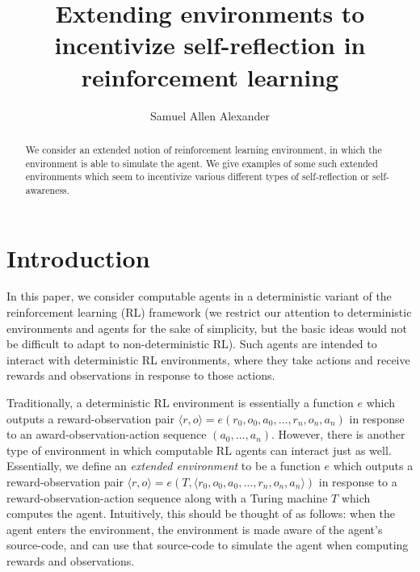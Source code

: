 \documentclass[runningheads]{llncs}
\begin{document}
\title{Extending environments to incentivize self-reflection
in reinforcement learning}

\author{Samuel Allen Alexander}

\maketitle

\begin{abstract}
    We consider an extended notion
    of reinforcement learning environment, in which the environment is able
    to simulate the agent. We give
    examples of some such extended environments which seem to incentivize
    various different types of self-reflection or self-awareness.
\end{abstract}

\section{Introduction}

In this paper, we consider computable agents in a deterministic variant of the reinforcement
learning (RL) framework (we restrict our attention to deterministic environments and
agents for the sake of simplicity, but the basic ideas would not be difficult to adapt
to non-deterministic RL). Such agents are intended to interact with deterministic RL
environments, where they take actions and receive rewards and observations in
response to those actions.

Traditionally, a deterministic RL environment is essentially a function
$e$ which outputs a reward-observation pair
$\langle r,o\rangle=e(r_0,o_0,a_0,\ldots,r_n,o_n,a_n)$ in response to an
award-observation-action sequence $(a_0,\ldots,a_n)$.
However, there is another type of environment in which
computable RL agents can interact just as well. Essentially, we define an \emph{extended
environment} to be a function $e$ which outputs a reward-observation pair
$\langle r,o\rangle=e(T,\langle r_0,o_0,a_0,\ldots,r_n,o_n,a_n \rangle)$ in response
to a reward-observation-action sequence
along with a Turing machine $T$ which computes the agent.
Intuitively, this should be thought of as follows: when the agent enters the environment,
the environment is made aware of the agent's source-code, and can use that
source-code to simulate the agent when computing rewards and observations.
\end{document}
